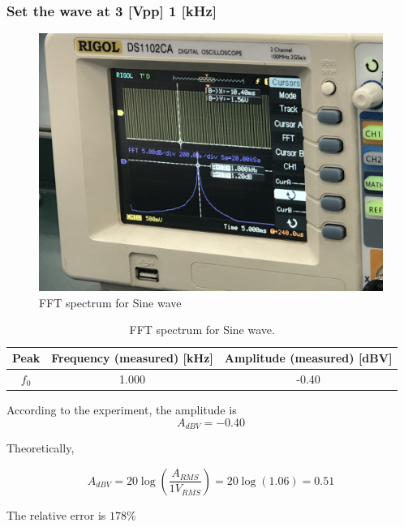 \documentclass{article}
\begin{document}
\subsubsection{Set the wave at 3 [Vpp] 1 [kHz]}
  \begin{figure}[H]
  \centering
  \includegraphics[width=.6\textwidth]{Figure7.jpg}
  \caption{FFT spectrum for Sine wave}
  \label{img} 
\end{figure}
\begin{table}[H]
\begin{center}
\begin{tabular}{|c|c|c|}
\hline
Peak & Frequency (measured) [kHz] & Amplitude (measured) [dBV] \\

\hline

$f_0$ &	1.000	&	-0.40	\\

\hline

\end{tabular}

\caption{FFT spectrum for Sine wave.}

\label{tab-2}

\end{center}

\end{table}
According to the experiment, the amplitude is 
$$A_{dBV}=-0.40$$

Theoretically,

$$A_{dBV}=20\log\left(\frac{A_{RMS}}{1V_{RMS}}\right)= 20\log (1.06)= 0.51$$

The relative error is $178\%$\\
\end{document}
